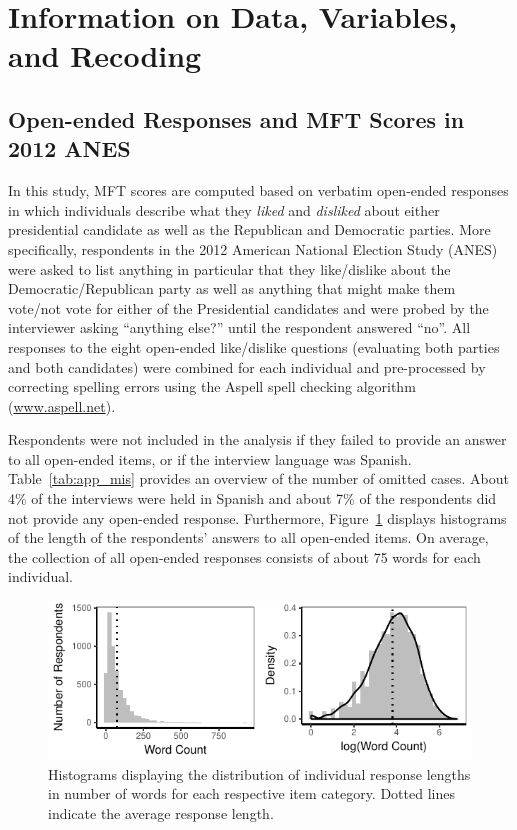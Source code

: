 \documentclass[12pt]{article}
\begin{document}
\clearpage

\renewcommand\thefigure{\thesection.\arabic{figure}}
\renewcommand\thetable{\thesection.\arabic{table}}
\setcounter{figure}{0}
\setcounter{table}{0}

\section{Information on Data, Variables, and Recoding}

\subsection{Open-ended Responses and MFT Scores in 2012 ANES}

In this study, MFT scores are computed based on verbatim open-ended responses in which individuals describe what they \textit{liked} and \textit{disliked} about either presidential candidate as well as the Republican and Democratic parties. More specifically, respondents in the 2012 American National Election Study (ANES) were asked to list anything in particular that they like/dislike about the Democratic/Republican party as well as anything that might make them vote/not vote for either of the Presidential candidates and were probed by the interviewer asking ``anything else?'' until the respondent answered ``no''. All responses to the eight open-ended like/dislike questions (evaluating both parties and both candidates) were combined for each individual and pre-processed by correcting spelling errors using the Aspell spell checking algorithm (\url{www.aspell.net}).



Respondents were not included in the analysis if they failed to provide an answer to all open-ended items, or if the interview language was Spanish. Table~\ref{tab:app_mis} provides an overview of the number of omitted cases. About 4\% of the interviews were held in Spanish and about 7\% of the respondents did not provide any open-ended response. Furthermore, Figure~\ref{fig:appB2num} displays histograms of the length of the respondents' answers to all open-ended items. On average, the collection of all open-ended responses consists of about 75 words for each individual.

\begin{figure}[h]\centering
\includegraphics{../calc/fig/app_wc.pdf}
\caption{Histograms displaying the distribution of individual response lengths in number of words for each respective item category. Dotted lines indicate the average response length.}\label{fig:appB2num}
\end{figure}
\end{document}
